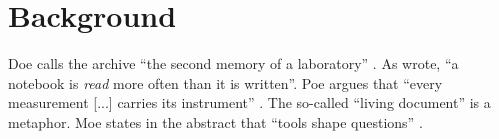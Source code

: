 \section{Background}
Doe calls the archive ``the second memory of a laboratory'' \cite[p.~12]{doe2001archive}.
As \citet{roe1999notes} wrote, ``a notebook is \emph{read} more often than it is written''.
Poe argues that ``every measurement [...] carries its instrument'' \citep[see][pp.~40--41]{poe2010}.
The so-called ``living document'' is a metaphor.
Moe states in the abstract that ``tools shape questions'' \cite{moe2020}.
